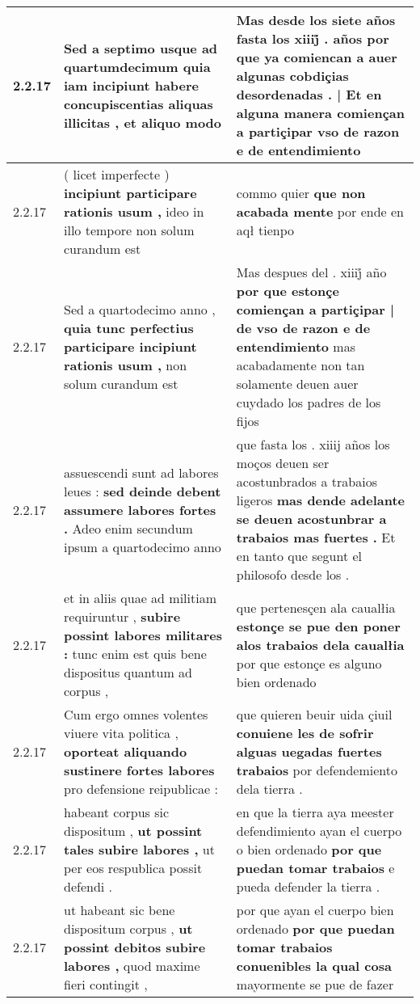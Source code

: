 \begin{tabular}{|p{1cm}|p{6.5cm}|p{6.5cm}|}
2.2.17 & Sed a septimo usque ad quartumdecimum \textbf{ quia iam incipiunt habere concupiscentias aliquas illicitas , } et aliquo modo & Mas desde los siete años fasta los xiiij̊ . años \textbf{ por que ya comiencan a auer algunas cobdiçias desordenadas . | Et en alguna manera comiençan a partiçipar vso de razon } e de entendimiento \\\hline
2.2.17 & ( licet imperfecte ) \textbf{ incipiunt participare rationis usum , } ideo in illo tempore non solum curandum est & commo quier \textbf{ que non acabada mente } por ende en aqł tienpo \\\hline
2.2.17 & Sed a quartodecimo anno , \textbf{ quia tunc perfectius participare incipiunt rationis usum , } non solum curandum est & Mas despues del . xiiij̊ año \textbf{ por que estonçe comiençan a partiçipar | de vso de razon e de entendimiento } mas acabadamente non tan solamente deuen auer cuydado los padres de los fijos \\\hline
2.2.17 & assuescendi sunt ad labores leues : \textbf{ sed deinde debent assumere labores fortes . } Adeo enim secundum ipsum a quartodecimo anno & que fasta los . xiiij años los moços deuen ser acostunbrados a trabaios ligeros \textbf{ mas dende adelante se deuen acostunbrar a trabaios mas fuertes . } Et en tanto que segunt el philosofo desde los . \\\hline
2.2.17 & et in aliis quae ad militiam requiruntur , \textbf{ subire possint labores militares : } tunc enim est quis bene dispositus quantum ad corpus , & que pertenesçen ala caualłia \textbf{ estonçe se pue den poner alos trabaios dela caualłia } por que estonçe es alguno bien ordenado \\\hline
2.2.17 & Cum ergo omnes volentes viuere vita politica , \textbf{ oporteat aliquando sustinere fortes labores } pro defensione reipublicae : & que quieren beuir uida çiuil \textbf{ conuiene les de sofrir alguas uegadas fuertes trabaios } por defendemiento dela tierra . \\\hline
2.2.17 & habeant corpus sic dispositum , \textbf{ ut possint tales subire labores , } ut per eos respublica possit defendi . & en que la tierra aya meester defendimiento ayan el cuerpo o bien ordenado \textbf{ por que puedan tomar trabaios } e pueda defender la tierra . \\\hline
2.2.17 & ut habeant sic bene dispositum corpus , \textbf{ ut possint debitos subire labores , } quod maxime fieri contingit , & por que ayan el cuerpo bien ordenado \textbf{ por que puedan tomar trabaios conuenibles la qual cosa } mayormente se pue de fazer \\\hline

\end{tabular}
